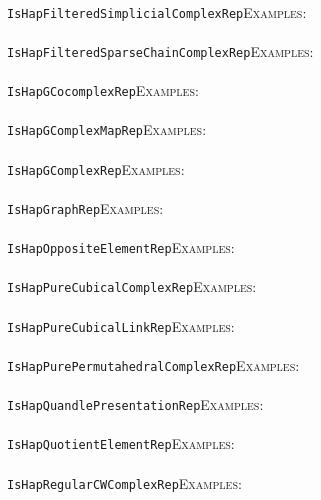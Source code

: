 \documentclass[a4paper,11pt]{report}
\begin{document}
{{ \\
 \texttt{IsHapFilteredSimplicialComplexRep}{\nobreakspace}{\nobreakspace}{\nobreakspace}{\nobreakspace}\textsc{Examples:} \\
 \\
 \texttt{IsHapFilteredSparseChainComplexRep}{\nobreakspace}{\nobreakspace}{\nobreakspace}{\nobreakspace}\textsc{Examples:} \\
 \\
 \texttt{IsHapGCocomplexRep}{\nobreakspace}{\nobreakspace}{\nobreakspace}{\nobreakspace}\textsc{Examples:} \\
 \\
 \texttt{IsHapGComplexMapRep}{\nobreakspace}{\nobreakspace}{\nobreakspace}{\nobreakspace}\textsc{Examples:} \\
 \\
 \texttt{IsHapGComplexRep}{\nobreakspace}{\nobreakspace}{\nobreakspace}{\nobreakspace}\textsc{Examples:} \\
 \\
 \texttt{IsHapGraphRep}{\nobreakspace}{\nobreakspace}{\nobreakspace}{\nobreakspace}\textsc{Examples:} \\
 \\
 \texttt{IsHapOppositeElementRep}{\nobreakspace}{\nobreakspace}{\nobreakspace}{\nobreakspace}\textsc{Examples:} \\
 \\
 \texttt{IsHapPureCubicalComplexRep}{\nobreakspace}{\nobreakspace}{\nobreakspace}{\nobreakspace}\textsc{Examples:} \\
 \\
 \texttt{IsHapPureCubicalLinkRep}{\nobreakspace}{\nobreakspace}{\nobreakspace}{\nobreakspace}\textsc{Examples:} \\
 \\
 \texttt{IsHapPurePermutahedralComplexRep}{\nobreakspace}{\nobreakspace}{\nobreakspace}{\nobreakspace}\textsc{Examples:} \\
 \\
 \texttt{IsHapQuandlePresentationRep}{\nobreakspace}{\nobreakspace}{\nobreakspace}{\nobreakspace}\textsc{Examples:} \\
 \\
 \texttt{IsHapQuotientElementRep}{\nobreakspace}{\nobreakspace}{\nobreakspace}{\nobreakspace}\textsc{Examples:} \\
 \\
 \texttt{IsHapRegularCWComplexRep}{\nobreakspace}{\nobreakspace}{\nobreakspace}{\nobreakspace}\textsc{Examples:} \\
 \\
}}
\end{document}
